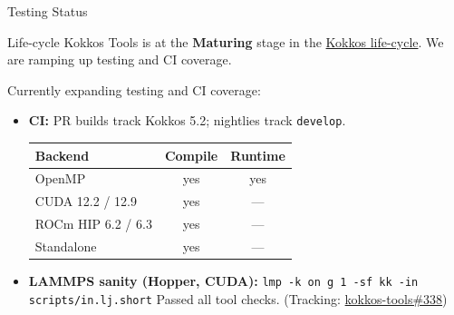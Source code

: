 \begin{frame}[fragile]{Testing Status}
  \footnotesize
  \vspace{4pt}
  \begin{block}{Life-cycle}
    Kokkos Tools is at the \textbf{Maturing} stage in the
    \href{https://github.com/kokkos/governance/blob/main/Life-Cycle.md}{Kokkos life-cycle}.
    We are ramping up testing and CI coverage.
  \end{block}
  Currently expanding testing and CI coverage:
  \begin{itemize}
    \item \textbf{CI:} PR builds track Kokkos 5.2; nightlies track \texttt{develop}.
      \vspace{2pt}
      \begin{center}
      \begin{tabular}{l|c|c}
        \textbf{Backend} & \textbf{Compile} & \textbf{Runtime} \\\hline
        OpenMP & yes & yes \\
        CUDA 12.2 / 12.9 & yes & --- \\
        ROCm HIP 6.2 / 6.3 & yes & --- \\
        Standalone & yes & --- \\
      \end{tabular}
      \end{center}
    \item \textbf{LAMMPS sanity (Hopper, CUDA):}
          \texttt{lmp -k on g 1 -sf kk -in scripts/in.lj.short}
          \newline
          Passed all tool checks.
          (Tracking: \href{https://github.com/kokkos/kokkos-tools/issues/338}{kokkos-tools\#338})
  \end{itemize}

\end{frame}

%
%
%
%
